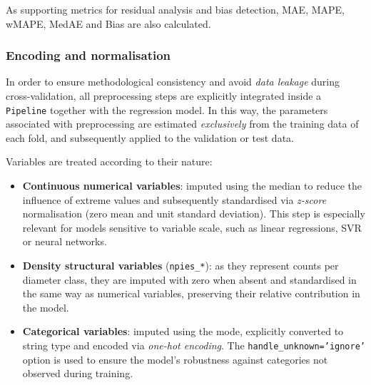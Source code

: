 As supporting metrics for residual analysis and bias detection, MAE, MAPE, wMAPE, MedAE and Bias are also calculated.


\subsubsection{Encoding and normalisation}

In order to ensure methodological consistency and avoid \emph{data leakage} during cross-validation, all preprocessing steps are explicitly integrated inside a \texttt{Pipeline} together with the regression model. In this way, the parameters associated with preprocessing are estimated \emph{exclusively} from the training data of each fold, and subsequently applied to the validation or test data.

Variables are treated according to their nature:

\begin{itemize}
    \item \textbf{Continuous numerical variables}: imputed using the median to reduce the influence of extreme values and subsequently standardised via \emph{z-score} normalisation (zero mean and unit standard deviation). This step is especially relevant for models sensitive to variable scale, such as linear regressions, SVR or neural networks.

    \item \textbf{Density structural variables} (\texttt{npies\_*}): as they represent counts per diameter class, they are imputed with zero when absent and standardised in the same way as numerical variables, preserving their relative contribution in the model.

    \item \textbf{Categorical variables}: imputed using the mode, explicitly converted to string type and encoded via \textit{one-hot encoding}. The \texttt{handle\_unknown='ignore'} option is used to ensure the model's robustness against categories not observed during training.
\end{itemize}

